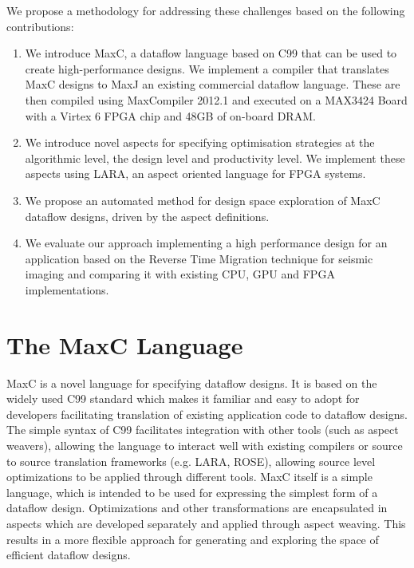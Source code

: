 We propose a methodology for addressing these challenges based on the
following contributions:
\begin{enumerate}
\item We introduce MaxC, a dataflow language based on C99 that can be
  used to create high-performance designs. We implement a compiler
  that translates MaxC designs to MaxJ an existing commercial dataflow
  language. These are then compiled using MaxCompiler 2012.1 and
  executed on a MAX3424 Board with a Virtex 6 FPGA chip and 48GB of
  on-board DRAM.
\item We introduce novel aspects for specifying optimisation
  strategies at the algorithmic level, the design level and
  productivity level. We implement these aspects using
  LARA, an aspect oriented language for FPGA systems.
\item We propose an automated method for design space exploration of
  MaxC dataflow designs, driven by the aspect definitions.
\item We evaluate our approach implementing a high performance design
  for an application based on the Reverse Time Migration technique for
  seismic imaging and comparing it with existing CPU, GPU and FPGA
  implementations.
\end{enumerate}




\section{The  MaxC Language}

MaxC is a novel language for specifying dataflow designs. It is based
on the widely used C99 standard which makes it familiar and easy to
adopt for developers facilitating translation of existing application
code to dataflow designs. The simple syntax of C99 facilitates
integration with other tools (such as aspect weavers), allowing the
language to interact well with existing compilers or source to source
translation frameworks (e.g. LARA, ROSE), allowing source level
optimizations to be applied through different tools. MaxC itself is a
simple language, which is intended to be used for expressing the
simplest form of a dataflow design. Optimizations and other
transformations are encapsulated in aspects which are developed
separately and applied through aspect weaving. This results in a more
flexible approach for generating and exploring the space of efficient
dataflow designs.


